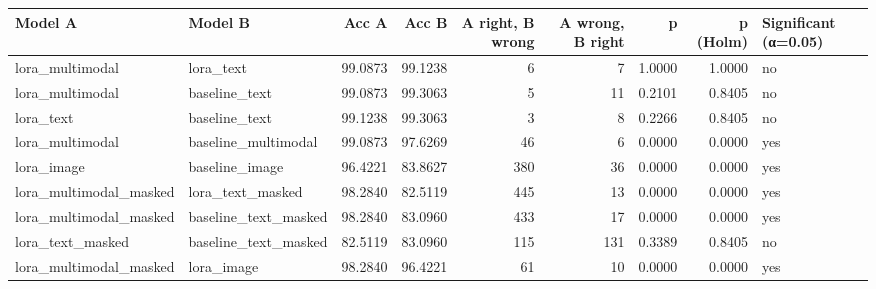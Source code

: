 \begin{tabular}{llrrrrrrl}
\toprule
Model A & Model B & Acc A & Acc B & A right, B wrong & A wrong, B right & p & p (Holm) & Significant (α=0.05) \\
\midrule
lora\_multimodal & lora\_text & 99.0873 & 99.1238 & 6 & 7 & 1.0000 & 1.0000 & no \\
lora\_multimodal & baseline\_text & 99.0873 & 99.3063 & 5 & 11 & 0.2101 & 0.8405 & no \\
lora\_text & baseline\_text & 99.1238 & 99.3063 & 3 & 8 & 0.2266 & 0.8405 & no \\
lora\_multimodal & baseline\_multimodal & 99.0873 & 97.6269 & 46 & 6 & 0.0000 & 0.0000 & yes \\
lora\_image & baseline\_image & 96.4221 & 83.8627 & 380 & 36 & 0.0000 & 0.0000 & yes \\
lora\_multimodal\_masked & lora\_text\_masked & 98.2840 & 82.5119 & 445 & 13 & 0.0000 & 0.0000 & yes \\
lora\_multimodal\_masked & baseline\_text\_masked & 98.2840 & 83.0960 & 433 & 17 & 0.0000 & 0.0000 & yes \\
lora\_text\_masked & baseline\_text\_masked & 82.5119 & 83.0960 & 115 & 131 & 0.3389 & 0.8405 & no \\
lora\_multimodal\_masked & lora\_image & 98.2840 & 96.4221 & 61 & 10 & 0.0000 & 0.0000 & yes \\
\bottomrule
\end{tabular}
